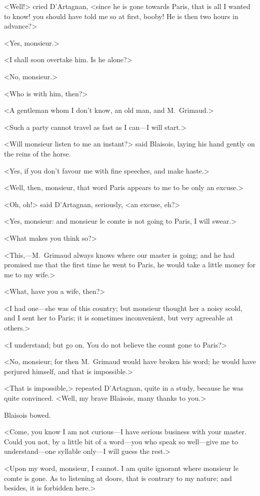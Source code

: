 <Well!> cried D'Artagnan, <since he is gone towards Paris, that is all I wanted to know! you should have told me so at first, booby! He is then two hours in advance?>

<Yes, monsieur.>

<I shall soon overtake him. Is he alone?>

<No, monsieur.>

<Who is with him, then?>

<A gentleman whom I don't know, an old man, and M.~Grimaud.>

<Such a party cannot travel as fast as I can—I will start.>

<Will monsieur listen to me an instant?> said Blaisois, laying his hand gently on the reins of the horse.

<Yes, if you don't favour me with fine speeches, and make haste.>

<Well, then, monsieur, that word Paris appears to me to be only an excuse.>

<Oh, oh!> said D'Artagnan, seriously, <an excuse, eh?>

<Yes, monsieur: and monsieur le comte is not going to Paris, I will swear.>

<What makes you think so?>

<This,—M.~Grimaud always knows where our master is going; and he had promised me that the first time he went to Paris, he would take a little money for me to my wife.>

<What, have you a wife, then?>

<I had one—she was of this country; but monsieur thought her a noisy scold, and I sent her to Paris; it is sometimes inconvenient, but very agreeable at others.>

<I understand; but go on. You do not believe the count gone to Paris?>

<No, monsieur; for then M.~Grimaud would have broken his word; he would have perjured himself, and that is impossible.>

<That is impossible,> repeated D'Artagnan, quite in a study, because he was quite convinced. <Well, my brave Blaisois, many thanks to you.>

Blaisois bowed.

<Come, you know I am not curious—I have serious business with your master. Could you not, by a little bit of a word—you who speak so well—give me to understand—one syllable only—I will guess the rest.>

<Upon my word, monsieur, I cannot. I am quite ignorant where monsieur le comte is gone. As to listening at doors, that is contrary to my nature; and besides, it is forbidden here.>

